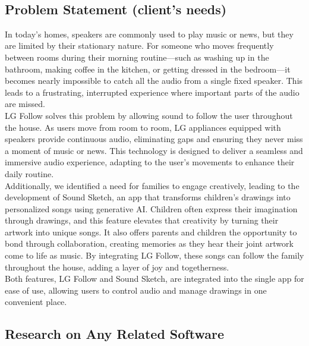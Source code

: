\documentclass[conference]{IEEEtran}
\begin{document}
\
\
\
\subsection{Problem Statement (client’s needs)}

In today’s homes, speakers are commonly used to play music or news, but they are limited by their stationary nature. For someone who moves frequently between rooms during their morning routine—such as washing up in the bathroom, making coffee in the kitchen, or getting dressed in the bedroom—it becomes nearly impossible to catch all the audio from a single fixed speaker. This leads to a frustrating, interrupted experience where important parts of the audio are missed.\\

LG Follow solves this problem by allowing sound to follow the user throughout the house. As users move from room to room, LG appliances equipped with speakers provide continuous audio, eliminating gaps and ensuring they never miss a moment of music or news. This technology is designed to deliver a seamless and immersive audio experience, adapting to the user's movements to enhance their daily routine.\\

Additionally, we identified a need for families to engage creatively, leading to the development of Sound Sketch, an app that transforms children's drawings into personalized songs using generative AI. Children often express their imagination through drawings, and this feature elevates that creativity by turning their artwork into unique songs. It also offers parents and children the opportunity to bond through collaboration, creating memories as they hear their joint artwork come to life as music. By integrating LG Follow, these songs can follow the family throughout the house, adding a layer of joy and togetherness.\\

Both features, LG Follow and Sound Sketch, are integrated into the single app for ease of use, allowing users to control audio and manage drawings in one convenient place. \\

 
\subsection{Research on Any Related Software}
\end{document}
